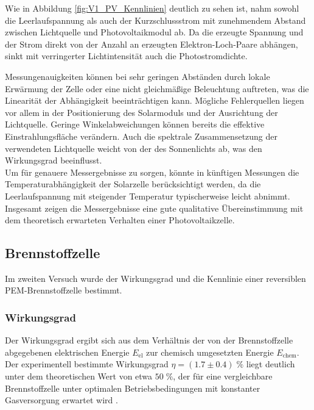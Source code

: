 \documentclass{article}
\begin{document}
\vspace{2mm}

\noindent Wie in Abbildung \ref{fig:V1_PV_Kennlinien} deutlich zu sehen ist, nahm sowohl die Leerlaufspannung als auch der Kurzschlussstrom mit zunehmendem Abstand zwischen Lichtquelle und Photovoltaikmodul ab. Da die erzeugte Spannung und der Strom direkt von der Anzahl an erzeugten Elektron-Loch-Paare abhängen, sinkt mit verringerter Lichtintensität auch die Photostromdichte.

\vspace{2mm}

\noindent Messungenauigkeiten können bei sehr geringen Abständen durch lokale Erwärmung der Zelle oder eine nicht gleichmäßige Beleuchtung auftreten, was die Linearität der Abhängigkeit beeinträchtigen kann. Mögliche Fehlerquellen liegen vor allem in der Positionierung des Solarmoduls und der Ausrichtung der Lichtquelle. Geringe Winkelabweichungen können bereits die effektive Einstrahlungsfläche verändern. Auch die spektrale Zusammensetzung der verwendeten Lichtquelle weicht von der des Sonnenlichts ab, was den Wirkungsgrad beeinflusst.\\
Um für genauere Messergebnisse zu sorgen, könnte in künftigen Messungen die Temperaturabhängigkeit der Solarzelle berücksichtigt werden, da die Leerlaufspannung mit steigender Temperatur typischerweise leicht abnimmt. Insgesamt zeigen die Messergebnisse eine gute qualitative Übereinstimmung mit dem theoretisch erwarteten Verhalten einer Photovoltaikzelle.


\subsection{Brennstoffzelle}
\noindent Im zweiten Versuch wurde der Wirkungsgrad und die Kennlinie einer reversiblen PEM-Brennstoffzelle bestimmt.

\subsubsection{Wirkungsgrad}
\noindent Der Wirkungsgrad ergibt sich aus dem Verhältnis der von der Brennstoffzelle abgegebenen elektrischen Energie \(E_\text{el}\) zur chemisch umgesetzten Energie \(E_\text{chem}\). Der experimentell bestimmte Wirkungsgrad \(\eta = (1.7 \pm 0.4)\;\%\) liegt deutlich unter dem theoretischen Wert von etwa \(50\;\%\), der für eine vergleichbare Brennstoffzelle unter optimalen Betriebsbedingungen mit konstanter Gasversorgung erwartet wird \cite{sfc_wirkungsgrad_brennstoffzelle}.
\vspace{2mm}
\end{document}
